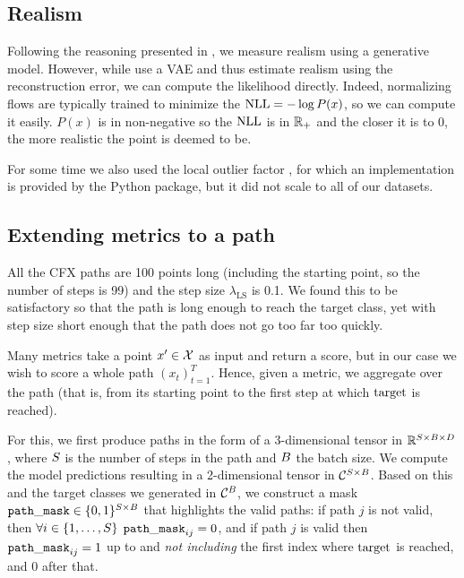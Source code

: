 \documentclass[../main.tex]{subfiles}
\begin{document}
\subsection{Realism}

Following the reasoning presented in \cite{vanlooverenInterpretable2021}, we measure realism using a generative model.
However, while \citeauthor{vanlooverenInterpretable2021} use a VAE and thus estimate realism using the reconstruction error, we can compute the likelihood directly.
Indeed, normalizing flows are typically trained to minimize the $\text{NLL} = - \log P(x)$, so we can compute it easily.
$P(x)$ is in non-negative so the $\text{NLL}$ is in $\mathbb{R}_+$ and the closer it is to 0, the more realistic the point is deemed to be.

For some time we also used the local outlier factor \cite{breunigLOF2000}, for which an implementation is provided by the \sklearn{} Python package, but it did not scale to all of our datasets.

\subsection{Extending metrics to a path}
\label{exp/masking}

All the CFX paths are 100 points long (including the starting point, so the number of steps is 99) and the step size $\lambda_\text{LS}$ is 0.1. We found this to be satisfactory so that the path is long enough to reach the target class, yet with step size short enough that the path does not go too far too quickly.

Many metrics take a point $x' \in \mathcal{X}$ as input and return a score, but in our case we wish to score a whole path $(x_t)_{t=1}^T$.
Hence, given a metric, we aggregate over the path (that is, from its starting point to the first step at which $\mathrm{target}$ is reached).

For this, we first produce paths in the form of a 3-dimensional tensor in $\mathbb{R}^{S \times B \times D}$,
where $S$ is the number of steps in the path and $B$ the batch size.
We compute the model predictions resulting in a 2-dimensional tensor in $\mathcal{C}^{S \times B}$.
Based on this and the target classes we generated in $\mathcal{C}^B$, we construct a mask $\mathtt{path\_mask} \in \{0, 1\}^{S \times B}$ that highlights the valid paths:
if path $j$ is not valid, then
$\forall i \in \{1, \ldots, S\}$ ${\mathtt{path\_mask}_{ij} = 0}$, and if path $j$ is valid then $\mathtt{path\_mask}_{ij} = 1$ up to and \emph{not including} the first index where $\mathrm{target}$ is reached, and 0 after that.
\end{document}
